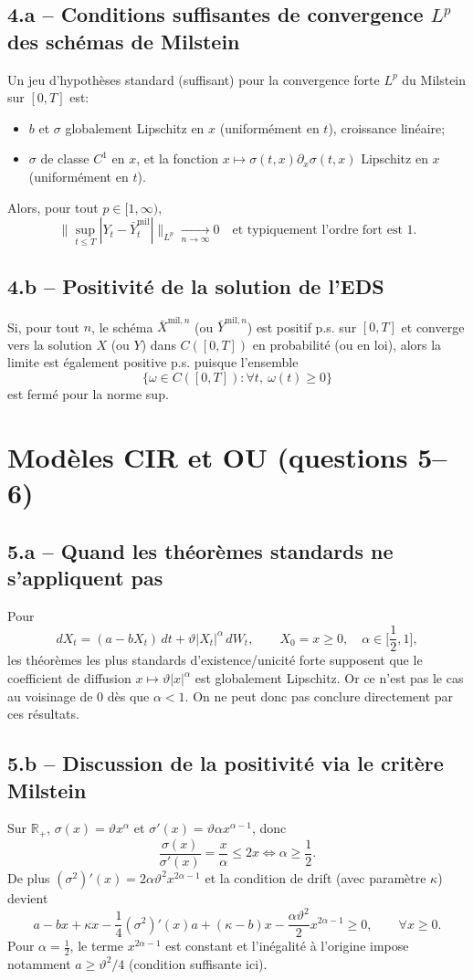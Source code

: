 \documentclass[11pt,a4paper]{article}
\newcommand{\R}{\mathbb{R}}
\newcommand{\1}{\mathbbm{1}}
\theoremstyle{plain}
\theoremstyle{definition}
\begin{document}
\subsection{4.a -- Conditions suffisantes de convergence $L^p$ des schémas de Milstein}
Un jeu d'hypothèses standard (suffisant) pour la convergence forte $L^p$ du Milstein sur $[0,T]$ est:
\begin{itemize}[leftmargin=*]
  \item $b$ et $\sigma$ globalement Lipschitz en $x$ (uniformément en $t$), croissance linéaire;
  \item $\sigma$ de classe $C^1$ en $x$, et la fonction $x\mapsto \sigma(t,x)\partial_x\sigma(t,x)$ Lipschitz en $x$ (uniformément en $t$).
\end{itemize}
Alors, pour tout $p\in[1,\infty)$,
\[
\Big\|\sup_{t\le T}|Y_t-\bar Y^{\mathrm{mil}}_t|\Big\|_{L^p}\xrightarrow[n\to\infty]{}0
\quad\text{et typiquement l'ordre fort est }1.
\]

\subsection{4.b -- Positivité de la solution de l'EDS}
Si, pour tout $n$, le schéma $\bar X^{\mathrm{mil},n}$ (ou $\bar Y^{\mathrm{mil},n}$) est positif p.s. sur $[0,T]$ et converge vers la solution $X$ (ou $Y$) dans $C([0,T])$ en probabilité (ou en loi), alors la limite est également positive p.s. puisque l'ensemble
\[
\{ \omega\in C([0,T]) : \forall t,\ \omega(t)\ge 0\}
\]
est fermé pour la norme sup.

\section{Modèles CIR et OU (questions 5--6)}
\subsection{5.a -- Quand les théorèmes standards ne s'appliquent pas}
Pour
\[
dX_t=(a-bX_t)\,dt+\vartheta |X_t|^\alpha\,dW_t,\qquad X_0=x\ge 0,\quad \alpha\in\Big[\frac12,1\Big],
\]
les théorèmes les plus standards d'existence/unicité forte supposent que le coefficient de diffusion $x\mapsto \vartheta|x|^\alpha$ est globalement Lipschitz. Or ce n'est pas le cas au voisinage de $0$ dès que $\alpha<1$. On ne peut donc pas conclure directement par ces résultats.

\subsection{5.b -- Discussion de la positivité via le critère Milstein}
Sur $\R_+$, $\sigma(x)=\vartheta x^\alpha$ et $\sigma'(x)=\vartheta\alpha x^{\alpha-1}$, donc
\[
\frac{\sigma(x)}{\sigma'(x)}=\frac{x}{\alpha}\le 2x \iff \alpha\ge \frac12.
\]
De plus $(\sigma^2)'(x)=2\alpha\vartheta^2 x^{2\alpha-1}$ et la condition de drift (avec paramètre $\kappa$) devient
\[
a-bx+\kappa x-\frac14(\sigma^2)'(x)
a+(\kappa-b)x-\frac{\alpha\vartheta^2}{2}x^{2\alpha-1}\ge 0,\qquad \forall x\ge 0.
\]
Pour $\alpha=\frac12$, le terme $x^{2\alpha-1}$ est constant et l'inégalité à l'origine impose notamment $a\ge \vartheta^2/4$ (condition suffisante ici).
\end{document}
